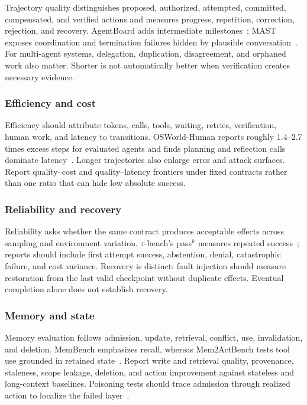 Trajectory quality distinguishes proposed, authorized, attempted, committed, compensated, and verified actions and measures progress, repetition, correction, rejection, and recovery. AgentBoard adds intermediate milestones~\cite{hsieh2024agentboard}; MAST exposes coordination and termination failures hidden by plausible conversation~\cite{cemri2025mast}. For multi-agent systems, delegation, duplication, disagreement, and orphaned work also matter. Shorter is not automatically better when verification creates necessary evidence.

\subsubsection{Efficiency and cost}

Efficiency should attribute tokens, calls, tools, waiting, retries, verification, human work, and latency to transitions. OSWorld-Human reports roughly 1.4--2.7 times excess steps for evaluated agents and finds planning and reflection calls dominate latency~\cite{abhyankar2025osworldhuman}. Longer trajectories also enlarge error and attack surfaces. Report quality--cost and quality--latency frontiers under fixed contracts rather than one ratio that can hide low absolute success.

\subsubsection{Reliability and recovery}

Reliability asks whether the same contract produces acceptable effects across sampling and environment variation. $\tau$-bench's pass$^k$ measures repeated success~\cite{yao2024taubench}; reports should include first attempt success, abstention, denial, catastrophic failure, and cost variance. Recovery is distinct: fault injection should measure restoration from the last valid checkpoint without duplicate effects. Eventual completion alone does not establish recovery.

\subsubsection{Memory and state}

Memory evaluation follows admission, update, retrieval, conflict, use, invalidation, and deletion. MemBench emphasizes recall, whereas Mem2ActBench tests tool use grounded in retained state~\cite{tan2025membench,shen2026mem2actbench}. Report write and retrieval quality, provenance, staleness, scope leakage, deletion, and action improvement against stateless and long-context baselines. Poisoning tests should trace admission through realized action to localize the failed layer~\cite{dash2026memorypoisoning}.

